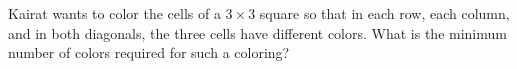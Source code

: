 Kairat wants to color the cells of a $3\times3$ square so that in each row, each column, and in both diagonals, the three cells have different colors. What is the minimum number of colors required for such a coloring?
